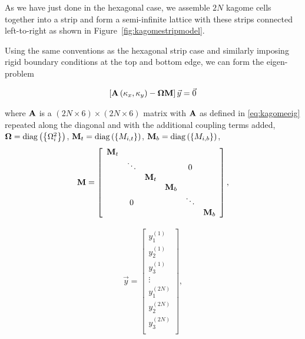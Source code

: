 As we have just done in the hexagonal case, we assemble $2N$ kagome cells
together into a strip and form a semi-infinite lattice with these strips
connected left-to-right as shown in Figure~\ref{fig:kagomestripmodel}.

Using the same conventions as the hexagonal strip case and similarly imposing
rigid boundary conditions at the top and bottom edge, we can form the
eigen-problem


\begin{align}
  \left[\mathbf{A}\left(\kappa_{x},\kappa_{y}\right)-\mathbf{\Omega}\mathbf{M}\right]\vec{y}=\vec{0}
\label{eq:kagomestripeig}
\end{align}

where $\mathbf{A}$ is a $(2N \times 6) \times (2N \times 6)$ matrix with
$\mathbf{A}$ as defined in \eqref{eq:kagomeeig} repeated along the diagonal and
with the additional coupling terms added,
$\mathbf{\Omega}=\operatorname{diag}\left(\left\{\Omega_i^2\right\}\right)$,
$\mathbf{M}_{t}=\operatorname{diag}\left(\left\{M_{i,t}\right\}\right)$,
$\mathbf{M}_{b}=\operatorname{diag}\left(\left\{M_{i,b}\right\}\right)$,
\begin{align}
\mathbf{M}=\left[
\begin{array}{cccccc}
\mathbf{M}_{t}\\
 & \ddots &  &  & 0\\
 &  & \mathbf{M}_{t}\\
 &  &  & \mathbf{M}_{b}\\
 & 0 &  &  & \ddots\\
 &  &  &  &  & \mathbf{M}_{b}
\end{array}\right],
\end{align}

\begin{align}
\vec{y}=\left[
\begin{array}{c}
y_1^{(1)}\\
y_2^{(1)}\\
y_3^{(1)}\\
\vdots\\
y_1^{(2N)}\\
y_2^{(2N)}\\
y_3^{(2N)}\\
\end{array}\right],
\end{align}

